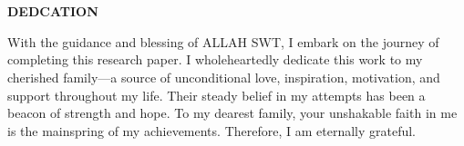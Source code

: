 \newenvironment{dedication}
{%
    \thispagestyle{empty}%
    \vspace*{\stretch{1}}%
    \centering
    \justifying      %
}
{\par %
    \vspace{\stretch{3}} %
    \clearpage           %
}

\section*{}
\begin{dedication}
    \begin{center}
        {\textbf{DEDCATION}}
    \end{center}
    With the guidance and blessing of ALLAH SWT, I embark on the journey of
    completing this research paper. I wholeheartedly dedicate this work to my cherished
    family---a source of unconditional love, inspiration, motivation, and support
    throughout my life. Their steady belief in my attempts has been
    a beacon of strength and hope. To my dearest family, your unshakable faith in me
    is the mainspring of my achievements. Therefore, I am eternally grateful.
\end{dedication}
